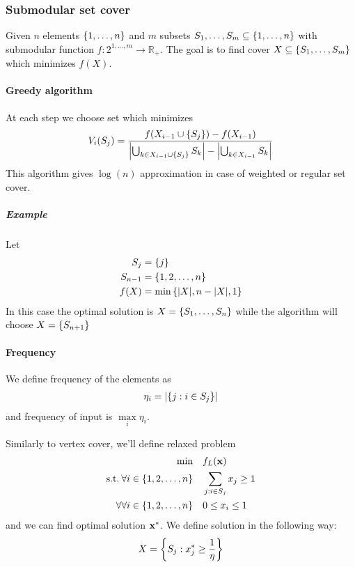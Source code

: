 \subsubsection{Submodular set cover }
Given $n$ elements $\qty{1,\dots, n}$ and $m$ subsets $S_1,\dots, S_m \subseteq \qty{1, \dots, n}$ with submodular function $f: 2^{1,\dots, m} \to \mathbb{R}_+$. The goal is to find cover $X\subseteq \qty{S_1, \dots, S_m}$ which minimizes $f(X)$.


\paragraph{Greedy algorithm}
At each step we choose set which minimizes
\begin{align}
V_i(S_j) = \frac{f\qty(X_{i-1} \cup \qty{S_j})-f\qty(X_{i-1} )}{\abs{\bigcup_{k\in X_{i-1}\cup \qty{S_j}} S_k} - \abs{\bigcup_{k\in X_{i-1}} S_k }}
\end{align}
This algorithm gives $\log(n)$ approximation in case of weighted or regular set cover.

\subparagraph{Example}
Let 
\begin{align}
S_j &= \qty{j}\\
S_{n-1} &= \qty{1,2,\dots, n}\\
f(X) &= \min \qty{ \abs{X}, n-\abs{X}, 1}
\end{align}
In this case the optimal solution is $X = \qty{S_1, \dots, S_n}$ while the algorithm will choose $X = \qty{S_{n+1}}$
\paragraph{Frequency}
We define frequency of the elements as 
\begin{align}
\eta_i = \abs{\qty{j: i \in S_j}}
\end{align}
and frequency of input is $\max\limits_i \eta_i$.

Similarly to vertex cover, we'll define relaxed problem
\begin{align} \label{eq:ssp_relax}
\min \quad&  f_L(\vb{x}) \\ 
\text{s.t.} \: \forall i \in \qty{1,2,\dots, n} \quad&\sum_{j: i\in S_j} x_j \geq 1 \\
\forall \forall i \in \qty{1,2,\dots, n} \quad&0\leq x_i \leq 1 
\end{align}
 and we can find optimal solution $\vb{x}^*$. We define solution in the following way:
 \begin{align}
 X = \qty{S_j: x_j^* \geq \frac{1}{\eta}}
 \end{align}
 
